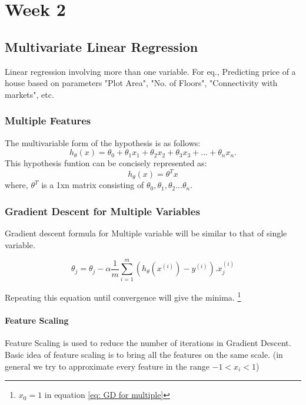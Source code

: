 \documentclass[12pt]{report}
\begin{document}
\chapter{Week 2}

\section{Multivariate Linear Regression}
Linear regression involving more than one variable. For eq., Predicting price of a house based on parameters "Plot Area", "No. of Floors", "Connectivity with markets", etc.

\subsection{Multiple Features}
The multivariable form of the hypothesis is as follows:
\begin{equation} \label {eq:5}
	h_\theta(x) = \theta_0 + \theta_1x_1 + \theta_2x_2 + \theta_ 3x_3 + ... + \theta_{n}x_n.	
\end{equation}
This hypothesis funtion can be concisely represented as:
\begin{equation}
	h_\theta(x) = \theta^{T}x
\end{equation}
where, $ \theta^T $ is a 1xn matrix consisting of $ \theta_0, \theta_1, \theta_2 ... \theta_n $.


\subsection{Gradient Descent for Multiple Variables}
Gradient descent formula for Multiple variable will be similar to that of single variable.

\begin{equation} \label {eq: GD for multiple}
	\theta_j =  \theta_j - \alpha \frac{1}{m} \sum_{i=1}^{m} (h_\theta(x^{(i)})-y^{(i)}).x_j^{(i)}
\end{equation}

Repeating this equation until convergence will give the minima. \footnote[1]{$x_0 = 1$ in equation \ref{eq: GD for multiple}}

\subsubsection{Feature Scaling}
Feature Scaling is used to reduce the number of iterations in Gradient Descent. Basic idea of feature scaling is to bring all the features on the same scale. (in general we try to approximate every feature in the range $ -1 < x_i < 1 $)
\end{document}
